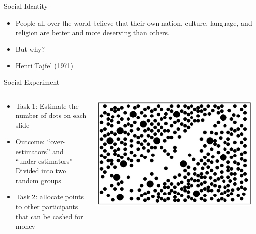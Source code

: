 \documentclass[
  ignorenonframetext,
  aspectratio=169,
]{beamer}
\providecommand{\tightlist}{%
  \setlength{\itemsep}{0pt}\setlength{\parskip}{0pt}}\usepackage{longtable,booktabs,array}
\begin{document}
\begin{frame}{Social Identity}
\label{social-identity-1}
\begin{itemize}[<+->]
\tightlist
\item
  People all over the world believe that their own nation, culture,
  language, and religion are better and more deserving than others.
\item
  But why?
\item
  Henri Tajfel (1971)
\end{itemize}
\end{frame}

\begin{frame}{Social Experiment}
\label{social-experiment}
\begin{columns}[c,totalwidth=8em]
\begin{column}{0.4\textwidth}
\begin{itemize}[<+->]
\tightlist
\item
  Task 1: Estimate the number of dots on each slide
\item
  Outcome: ``over-estimators'' and ``under-estimators'' Divided into two
  random groups
\item
  Task 2: allocate points to other participants that can be cashed for
  money
\end{itemize}
\end{column}

\begin{column}{0.6\textwidth}
\includegraphics{figs/tajfel.png}
\end{column}
\end{columns}
\end{frame}
\end{document}
